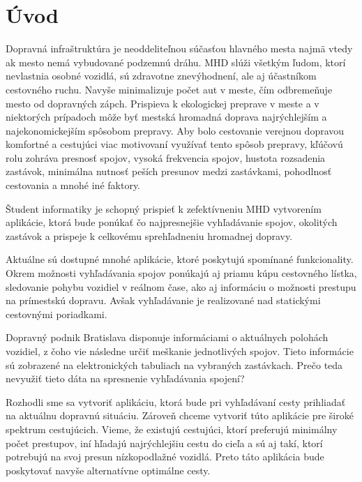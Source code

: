 \chapter*{Úvod} %

Dopravná infraštruktúra je neoddeliteľnou súčasťou hlavného mesta najmä vtedy ak mesto nemá vybudované podzemnú dráhu. 
MHD slúži všetkým ľudom, ktorí nevlastnia osobné vozidlá, sú zdravotne znevýhodnení, ale aj
účastníkom cestovného ruchu. Navyše minimalizuje počet aut v meste, čím odbremeňuje mesto od dopravných zápch. Prispieva k ekologickej preprave v meste a v niektorých prípadoch môže byť mestská hromadná doprava najrýchlejším a najekonomickejším spôsobom prepravy.
Aby bolo cestovanie verejnou dopravou komfortné a cestujúci viac motivovaní využívať tento spôsob prepravy, kľúčovú rolu zohráva presnosť spojov, vysoká frekvencia spojov, hustota rozsadenia zastávok, minimálna nutnosť peších presunov medzi zastávkami, pohodlnosť cestovania a mnohé iné faktory. 

Študent informatiky je schopný prispieť k zefektívneniu MHD vytvorením aplikácie, ktorá bude ponúkať čo najpresnejšie vyhľadávanie spojov, okolitých zastávok a prispeje k celkovému sprehľadneniu hromadnej dopravy.

Aktuálne sú dostupné mnohé aplikácie, ktoré poskytujú spomínané funkcionality. Okrem možnosti vyhľadávania spojov ponúkajú aj priamu kúpu cestovného lístka, sledovanie pohybu vozidiel v reálnom čase, ako aj informáciu o možnosti prestupu na prímestskú dopravu. Avšak vyhľadávanie je realizované nad statickými cestovnými poriadkami. 

Dopravný podnik Bratislava disponuje informáciami o aktuálnych polohách vozidiel, z čoho vie následne určiť meškanie jednotlivých spojov. Tieto informácie sú zobrazené na elektronických tabuliach na vybraných zastávkach. Prečo teda nevyužiť tieto dáta na spresnenie vyhľadávania spojení? 

Rozhodli sme sa vytvoriť aplikáciu, ktorá bude pri vyhľadávaní cesty prihliadať na aktuálnu dopravnú situáciu. Zároveň chceme vytvoriť túto aplikácie pre široké spektrum cestujúcich. Vieme, že existujú cestujúci, ktorí preferujú minimálny počet prestupov, iní hľadajú najrýchlejšiu cestu do cieľa a sú aj takí, ktorí potrebujú na svoj presun nízkopodlažné vozidlá. Preto táto aplikácia bude poskytovať navyše alternatívne optimálne cesty.

